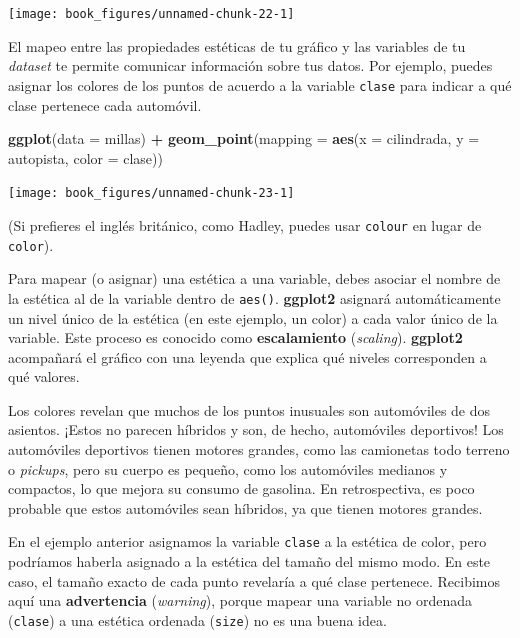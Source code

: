 \documentclass[11pt,oneside]{report}
\newenvironment{Shaded}{\begin{snugshade}}{\end{snugshade}}
\newcommand{\DataTypeTok}[1]{\textcolor[rgb]{0.13,0.29,0.53}{#1}}
\newcommand{\KeywordTok}[1]{\textcolor[rgb]{0.13,0.29,0.53}{\textbf{#1}}}
\newcommand{\NormalTok}[1]{#1}
\newcommand{\OperatorTok}[1]{\textcolor[rgb]{0.81,0.36,0.00}{\textbf{#1}}}
\newcommand{\StringTok}[1]{\textcolor[rgb]{0.31,0.60,0.02}{#1}}
\begin{document}
\begin{center}\texttt{[image: book\_figures/unnamed-chunk-22-1]} \end{center}

El mapeo entre las propiedades estéticas de tu gráfico y las variables
de tu \emph{dataset} te permite comunicar información sobre tus datos.
Por ejemplo, puedes asignar los colores de los puntos de acuerdo a la
variable \texttt{clase} para indicar a qué clase pertenece cada
automóvil.

\begin{Shaded}
\begin{Highlighting}[]
\KeywordTok{ggplot}\NormalTok{(}\DataTypeTok{data =}\NormalTok{ millas) }\OperatorTok{+}
\StringTok{  }\KeywordTok{geom_point}\NormalTok{(}\DataTypeTok{mapping =} \KeywordTok{aes}\NormalTok{(}\DataTypeTok{x =}\NormalTok{ cilindrada, }\DataTypeTok{y =}\NormalTok{ autopista, }\DataTypeTok{color =}\NormalTok{ clase))}
\end{Highlighting}
\end{Shaded}

\begin{center}\texttt{[image: book\_figures/unnamed-chunk-23-1]} \end{center}

(Si prefieres el inglés británico, como Hadley, puedes usar
\texttt{colour} en lugar de \texttt{color}).

Para mapear (o asignar) una estética a una variable, debes asociar el
nombre de la estética al de la variable dentro de \texttt{aes()}.
\textbf{ggplot2} asignará automáticamente un nivel único de la estética
(en este ejemplo, un color) a cada valor único de la variable. Este
proceso es conocido como \textbf{escalamiento} (\emph{scaling}).
\textbf{ggplot2} acompañará el gráfico con una leyenda que explica qué
niveles corresponden a qué valores.

Los colores revelan que muchos de los puntos inusuales son automóviles
de dos asientos. ¡Estos no parecen híbridos y son, de hecho, automóviles
deportivos! Los automóviles deportivos tienen motores grandes, como las
camionetas todo terreno o \emph{pickups}, pero su cuerpo es pequeño,
como los automóviles medianos y compactos, lo que mejora su consumo de
gasolina. En retrospectiva, es poco probable que estos automóviles sean
híbridos, ya que tienen motores grandes.

En el ejemplo anterior asignamos la variable \texttt{clase} a la
estética de color, pero podríamos haberla asignado a la estética del
tamaño del mismo modo. En este caso, el tamaño exacto de cada punto
revelaría a qué clase pertenece. Recibimos aquí una \textbf{advertencia}
(\emph{warning}), porque mapear una variable no ordenada
(\texttt{clase}) a una estética ordenada (\texttt{size}) no es una buena
idea.
\end{document}
